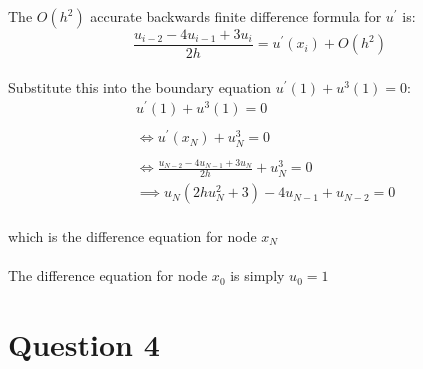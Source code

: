 \documentclass[fleqn]{report}
\begin{document}
The $O(h^2)$ accurate backwards finite difference formula for $u^{\prime}$ is:
\begin{equation}
\frac{u_{i-2} - 4u_{i-1} + 3u_i}{2h} = u^{\prime}(x_i) + O(h^2)
\end{equation}
\\
Substitute this into the boundary equation $u^{\prime}(1) + u^3(1) = 0$:
\begin{equation}
\begin{split}
&u^{\prime}(1) + u^3(1) = 0\\\\
&\iff u^{\prime}(x_N) + u_N^3 = 0\\\\
&\iff \frac{u_{N-2} - 4u_{N-1} + 3u_N}{2h} + u_N^3 = 0\\
&\implies u_N(2hu_N^2 + 3) - 4u_{N-1} + u_{N-2} = 0
\end{split}
\end{equation}
\\
which is the difference equation for node $x_N$\\\\
The difference equation for node $x_0$ is simply $u_0 = 1$

\section{Question 4}
\end{document}
